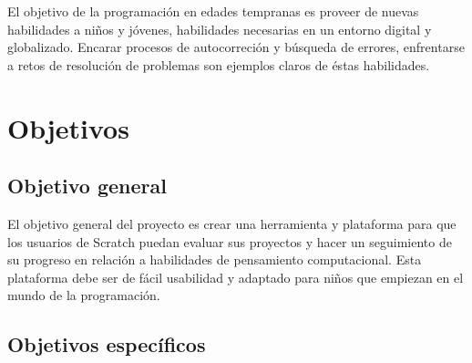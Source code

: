 \documentclass[a4paper, 12pt]{book}
\begin{document}
El objetivo de la programación en edades tempranas es proveer de nuevas habilidades a niños y
jóvenes, habilidades necesarias en un entorno digital y globalizado. Encarar procesos de
autocorreción y búsqueda de errores, enfrentarse a retos de resolución de problemas son ejemplos
claros de éstas habilidades.








\cleardoublepage
\chapter{Objetivos}
\label{chap:objetivos}

\section{Objetivo general}
\label{sec:objetivo-general}

El objetivo general del proyecto es crear una herramienta y plataforma para que los
usuarios de Scratch puedan evaluar sus proyectos y hacer un seguimiento de su progreso
en relación a habilidades de pensamiento computacional. Esta plataforma debe ser
de fácil usabilidad y adaptado para niños que empiezan en el mundo de la 
programación.


\section{Objetivos específicos}
\label{sec:objetivos-especificos}
\end{document}
